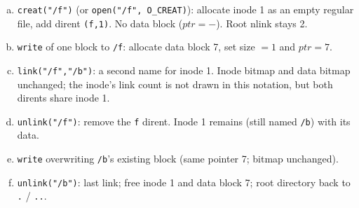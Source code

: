 \documentclass[11pt,a4paper]{article}
\newenvironment{Sol}{%
  \begin{tcolorbox}[sboxstyle, title={Solution}]%
}{%
  \end{tcolorbox}\vspace{0.35em}%
}
\begin{document}
\begin{Sol}
\begin{enumerate}[(a)]
\item \texttt{creat("/f")} (or \texttt{open("/f", O\_CREAT)}): allocate
      inode 1 as an empty regular file, add dirent \texttt{(f,1)}. No
      data block ($ptr=-$). Root nlink stays 2.
\item \texttt{write} of one block to \texttt{/f}: allocate data block 7,
      set size $=1$ and $ptr=7$.
\item \texttt{link("/f","/b")}: a second name for inode 1. Inode bitmap
      and data bitmap unchanged; the inode's link count is not drawn in
      this notation, but both dirents share inode 1.
\item \texttt{unlink("/f")}: remove the \texttt{f} dirent. Inode 1 remains
      (still named \texttt{/b}) with its data.
\item \texttt{write} overwriting \texttt{/b}'s existing block (same
      pointer 7; bitmap unchanged).
\item \texttt{unlink("/b")}: last link; free inode 1 and data block 7;
      root directory back to \texttt{.} / \texttt{..}.
\end{enumerate}
\end{Sol}
\end{document}
